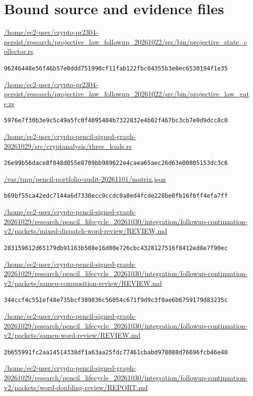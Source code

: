 \documentclass[10pt]{article}
\begin{document}
\section*{Bound source and evidence files}
\noindent\url{/home/ec2-user/crypto-pr2304-persist/research/projective_law_followup_20261022/src/bin/projective_state_collector.rs}\par
{\scriptsize\texttt{96246448e56f46b57e0ddd751990cf11fab122fbc04355b3e0ec6530194f1e35}}\par\medskip
\noindent\url{/home/ec2-user/crypto-pr2304-persist/research/projective_law_followup_20261022/src/bin/projective_law_gate.rs}\par
{\scriptsize\texttt{5976e7f30b3e9c5c49a5fc0f4095404b7322832e4b02f467bc3cb7e0d9dcc8c0}}\par\medskip
\noindent\url{/home/ec2-user/crypto-pencil-signed-graph-20261029/src/cryptanalysis/three_leads.rs}\par
{\scriptsize\texttt{26e99b56dace8f848d055e8709bb989622e4caea65aec26d63e00805153dc3c6}}\par\medskip
\noindent\url{/var/tmp/pencil-portfolio-audit-20261101/matrix.json}\par
{\scriptsize\texttt{b69bf55ca42edc7144a6d7330ecc9ccdc0a8ed4fcde228be0fb16f6ff4efa7ff}}\par\medskip
\noindent\url{/home/ec2-user/crypto-pencil-signed-graph-20261029/research/pencil_lifecycle_20261030/integration/followup-continuation-v2/packets/mixed-dispatch-word-review/REVIEW.md}\par
{\scriptsize\texttt{283159612d65179db91163b508e16d00e726cbc4328127516f8412ed8e7f90ec}}\par\medskip
\noindent\url{/home/ec2-user/crypto-pencil-signed-graph-20261029/research/pencil_lifecycle_20261030/integration/followup-continuation-v2/packets/sameu-composition-review/REVIEW.md}\par
{\scriptsize\texttt{344ccf4c551ef48e735bcf389836c56054c671f9d9c3f0ae6b6759179d83235c}}\par\medskip
\noindent\url{/home/ec2-user/crypto-pencil-signed-graph-20261029/research/pencil_lifecycle_20261030/integration/followup-continuation-v2/packets/sameu-word-review/REVIEW.md}\par
{\scriptsize\texttt{2b655991fc2aa14514338df1a63aa25fdc77461cbabd978088d76696fcb46e40}}\par\medskip
\noindent\url{/home/ec2-user/crypto-pencil-signed-graph-20261029/research/pencil_lifecycle_20261030/integration/followup-continuation-v2/packets/word-doubling-review/REPORT.md}\par
\end{document}
